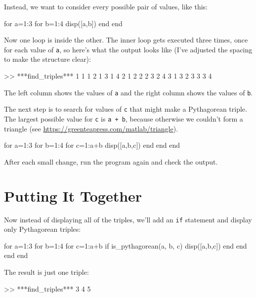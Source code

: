 Instead, we want to consider every possible pair of values, like this:

\begin{code}
for a=1:3
    for b=1:4
        disp([a,b])
    end
end
\end{code}

Now one loop is inside the other.  The inner loop gets executed three times, once for each value of \lstinline{a}, so here's what the output looks like (I've adjusted the spacing to make the structure clear):

\begin{code}
>> ***find_triples***
     1     1
     1     2
     1     3
     1     4
     2     1
     2     2
     2     3
     2     4
     3     1
     3     2
     3     3
     3     4
\end{code}

The left column shows the values of \lstinline{a} and the right column shows the values of \lstinline{b}.

The next step is to search for values of \lstinline{c} that might make a Pythagorean triple.  The largest possible value for \lstinline{c} is \lstinline{a + b}, because otherwise we couldn't form a triangle 
(see \url{https://greenteapress.com/matlab/triangle}).

\begin{code}
for a=1:3
    for b=1:4
        for c=1:a+b
            disp([a,b,c])
        end
    end
end
\end{code}

After each small change, run the program again and check the output.

\section{Putting It Together}

Now instead of displaying all of the triples, we'll add an \lstinline{if} statement and display only Pythagorean triples:

\begin{code}
for a=1:3
    for b=1:4
        for c=1:a+b
            if is_pythagorean(a, b, c)
                disp([a,b,c])
            end
        end
    end
end
\end{code}

The result is just one triple:

\begin{code}
>> ***find_triples***
     3     4     5
\end{code}

